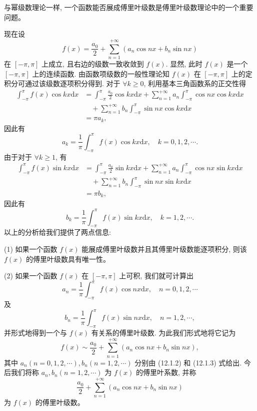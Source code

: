\documentclass[UTF8,12pt,a4paper,fontset=fandol]{ctexart}
\begin{document}
与幂级数理论一样, 一个函数能否展成傅里叶级数是傅里叶级数理论中的一个重要问题。

现在设
\[
  f(x)=\frac{a_0}{2}+\sum_{n=1}^{+\infty}(a_n\cos nx+b_n\sin nx)
\]
在 $[-\pi,\pi]$ 上成立, 且右边的级数一致收敛到 $f(x)$. 显然, 此时 $f(x)$ 是一个 $[-\pi,\pi]$ 上的连续函数. 由函数项级数的一般性理论知 $f(x)$ 在 $[-\pi,\pi]$ 上的定积分可通过该级数逐项积分得到. 对于 $\forall k\geqslant0$, 利用基本三角函数系的正交性得
\[
\begin{aligned}
  \int_{-\pi}^{\pi}f(x)\cos kx\mathrm dx
  &=\int_{-\pi}^{\pi}\frac{a_0}{2}\cos kx\mathrm dx
    +\sum_{n=1}^{+\infty}a_n\int_{-\pi}^{\pi}\cos nx\cos kx\mathrm dx \\
  &\quad+\sum_{n=1}^{+\infty}b_n\int_{-\pi}^{\pi}\sin nx\cos kx\mathrm dx \\
  &=\pi a_k,
\end{aligned}
\]
因此有
\[
  a_k=\frac1\pi\int_{-\pi}^{\pi}f(x)\cos kx\mathrm dx,\quad k=0,1,2,\cdots.
\]
由于对于 $\forall k\geqslant1$, 有
\[
\begin{aligned}
  \int_{-\pi}^{\pi}f(x)\sin kx\mathrm dx
  &=\int_{-\pi}^{\pi}\frac{a_0}{2}\sin kx\mathrm dx
    +\sum_{n=1}^{+\infty}a_n\int_{-\pi}^{\pi}\cos nx\sin kx\mathrm dx \\
  &\quad+\sum_{n=1}^{+\infty}b_n\int_{-\pi}^{\pi}\sin nx\sin kx\mathrm dx \\
  &=\pi b_k,
\end{aligned}
\]
因此有
\[
  b_k=\frac1\pi\int_{-\pi}^{\pi}f(x)\sin kx\mathrm dx,\quad k=1,2,\cdots.
\]
以上的分析给我们提供了两点信息:

(1) 如果一个函数 $f(x)$ 能展成傅里叶级数并且其傅里叶级数能逐项积分, 则该 $f(x)$ 的傅里叶级数具有唯一性。

(2) 如果一个函数 $f(x)$ 在 $[-\pi,\pi]$ 上可积, 我们就可计算出
\begin{equation}
  a_n=\frac1\pi\int_{-\pi}^{\pi}f(x)\cos nx\mathrm dx,\quad n=0,1,2,\cdots
  \tag{12.1.2}
\end{equation}
及
\begin{equation}
  b_n=\frac1\pi\int_{-\pi}^{\pi}f(x)\sin nx\mathrm dx,\quad n=1,2,\cdots,
  \tag{12.1.3}
\end{equation}
并形式地得到一个与 $f(x)$ 有关系的傅里叶级数. 为此我们形式地将它记为
\begin{equation}
  f(x)\sim\frac{a_0}{2}+\sum_{n=1}^{+\infty}(a_n\cos nx+b_n\sin nx),
  \tag{12.1.4}
\end{equation}
其中 $a_n(n=0,1,2,\cdots), b_n(n=1,2,\cdots)$ 分别由 (12.1.2) 和 (12.1.3) 式给出. 今后我们将称 $a_n,b_n(n=1,2,\cdots)$ 为 $f(x)$ 的傅里叶系数, 并称
\[
  \frac{a_0}{2}+\sum_{n=1}^{+\infty}(a_n\cos nx+b_n\sin nx)
\]
为 $f(x)$ 的傅里叶级数。
\end{document}
